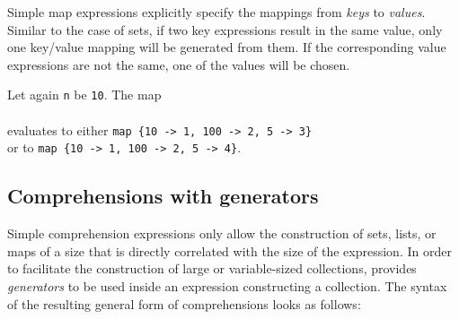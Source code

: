 

Simple map expressions explicitly specify the mappings from {\em keys}
to {\em values}. Similar to the case of sets, if two key expressions
result in the same value, only one key/value mapping will be generated
from them. If the corresponding value expressions are not the same,
one of the values will be chosen.


\begin{example}
  Let again {\tt n} be {\tt 10}. The map\\
  \\
  evaluates to either {\tt map \{10 -> 1, 100 -> 2, 5 -> 3\}}\\
  or to {\tt map \{10 -> 1, 100 -> 2, 5 -> 4\}}.
\end{example}


\subsection{Comprehensions with generators}\label{sect:ComprehensionsWithGenerators}



Simple comprehension expressions only allow the construction of sets,
lists, or maps of a size that is directly correlated with the size of
the expression. In order to facilitate the construction of large or
variable-sized collections, \Cal provides {\em generators} to be used
inside an expression constructing a collection. The syntax of the
resulting general form of comprehensions looks as
follows:



\index{-\charMore@{\tt ->}}

